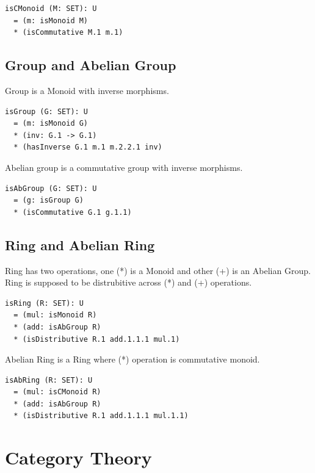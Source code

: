 \documentclass{article}
\begin{document}
\begin{lstlisting}[mathescape=true]
isCMonoid (M: SET): U
  = (m: isMonoid M)
  * (isCommutative M.1 m.1)
\end{lstlisting}

\subsection{Group and Abelian Group}

Group is a Monoid with inverse morphisms.

\begin{lstlisting}[mathescape=true]
isGroup (G: SET): U
  = (m: isMonoid G)
  * (inv: G.1 -> G.1)
  * (hasInverse G.1 m.1 m.2.2.1 inv)
\end{lstlisting}

Abelian group is a commutative group with inverse morphisms.

\begin{lstlisting}[mathescape=true]
isAbGroup (G: SET): U
  = (g: isGroup G)
  * (isCommutative G.1 g.1.1)
\end{lstlisting}

\subsection{Ring and Abelian Ring}

Ring has two operations, one (*) is a Monoid and other (+) is an Abelian Group.
Ring is supposed to be distrubitive across (*) and (+) operations.

\begin{lstlisting}[mathescape=true]
isRing (R: SET): U
  = (mul: isMonoid R)
  * (add: isAbGroup R)
  * (isDistributive R.1 add.1.1.1 mul.1)
\end{lstlisting}

Abelian Ring is a Ring where (*) operation is commutative monoid.

\begin{lstlisting}[mathescape=true]
isAbRing (R: SET): U
  = (mul: isCMonoid R)
  * (add: isAbGroup R)
  * (isDistributive R.1 add.1.1.1 mul.1.1)
\end{lstlisting}

\section{Category Theory}
\end{document}
